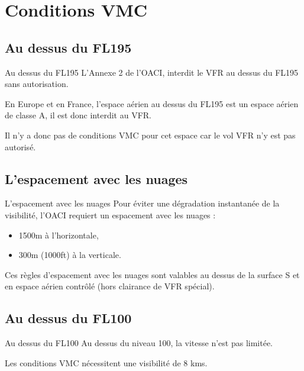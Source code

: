 \documentclass{beamer}
\begin{document}
\section{Conditions VMC}
\subsection{Au dessus du FL195}

\begin{frame}{Au dessus du FL195}
  L'Annexe 2 de l'OACI, interdit le VFR au dessus du FL195 sans
  autorisation.
  
  En Europe et en France, l'espace aérien au dessus du FL195 est un
  espace aérien de classe A, il est donc interdit au VFR.

  Il n'y a donc pas de conditions VMC pour cet espace car le vol VFR
  n'y est pas autorisé.
\end{frame}

\subsection{L'espacement avec les nuages}

\begin{frame}{L'espacement avec les nuages}
  Pour éviter une dégradation instantanée de la visibilité, l'OACI
  requiert un espacement avec les nuages :

  \begin{itemize}
    \item 1500m à l'horizontale, \pause
    \item 300m (1000ft) à la verticale.
  \end{itemize}

  Ces règles d'espacement avec les nuages sont valables au dessus de
  la surface S et en espace aérien contrôlé (hors clairance de VFR
  spécial).
  
\end{frame}


\subsection{Au dessus du FL100}

\begin{frame}{Au dessus du FL100}
  Au dessus du niveau 100, la vitesse n'est pas limitée.

  Les conditions VMC nécessitent une visibilité de 8 kms.
\end{frame}
\end{document}
